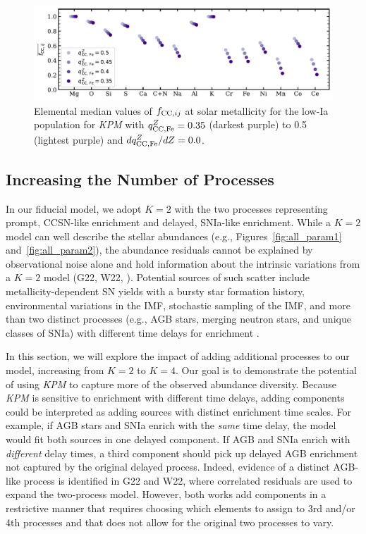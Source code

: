 \documentclass[modern]{aastex631}
\newcommand{\qccFe}{q_{{\rm CC, Fe}}^{Z}}
\newcommand{\dqccFe}{dq_{{\rm CC, Fe}}^{Z}/dZ}
\newcommand{\fcc}{f_{{\rm CC}, ij}}
\newcommand{\name}{\textsl{KPM}}
\begin{document}
\begin{figure}[htb!]
    \centering
    \includegraphics[width=\textwidth]{Paper/Figures/qccFe_fcc.pdf}
    \caption{Elemental median values of $\fcc$ at solar metallicity for the low-Ia population for \name{} with $\qccFe=0.35$ (darkest purple) to 0.5 (lightest purple) and $\dqccFe=0.0$.}
    \label{fig:qccFe_fcc}
\end{figure}

\subsection{Increasing the Number of Processes} \label{subsec:k=4}

In our fiducial model, we adopt $K=2$ with the two processes representing prompt, CCSN-like enrichment and delayed, SNIa-like enrichment. While a $K=2$ model can well describe the stellar abundances (e.g., Figures~\ref{fig:all_param1} and~\ref{fig:all_param2}), the abundance residuals cannot be explained by observational noise alone and hold information about the intrinsic variations from a $K=2$ model (G22, W22, \citealp{ting2022}). Potential sources of such scatter include metallicity-dependent SN yields with a bursty star formation history, environmental variations in the IMF, stochastic sampling of the IMF, and more than two distinct processes (e.g., AGB stars, merging neutron stars, and unique classes of SNIa) with different time delays for enrichment \citep[e.g.][]{belokurov2022, griffith2023}. 

In this section, we will explore the impact of adding additional processes to our model, increasing from $K=2$ to $K=4$. Our goal is to demonstrate the potential of using \name{} to capture more of the observed abundance diversity. Because \name{} is sensitive to enrichment with different time delays, adding components could be interpreted as adding sources with distinct enrichment time scales. For example, if AGB stars and SNIa enrich with the \textit{same} time delay, the model would fit both sources in one delayed component. If AGB and SNIa enrich with \textit{different} delay times, a third component should pick up delayed AGB enrichment not captured by the original delayed process. Indeed, evidence of a distinct AGB-like process is identified in G22 and W22, where correlated residuals are used to expand the two-process model. However, both works add components in a restrictive manner that requires choosing which elements to assign to 3rd and/or 4th processes and that does not allow for the original two processes to vary. 
\end{document}
